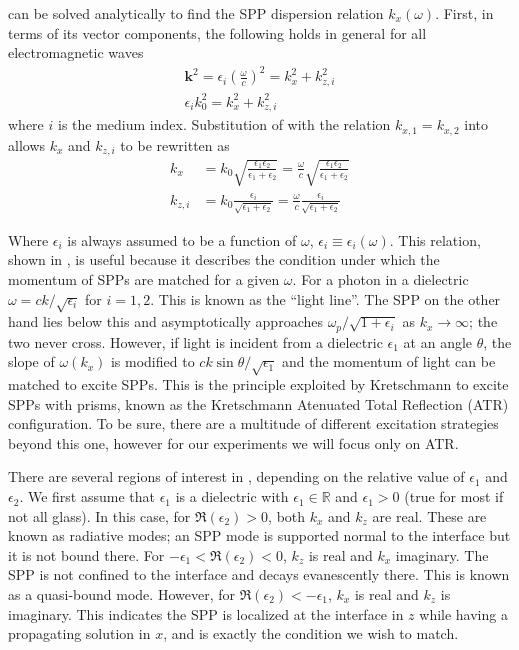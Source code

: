  can be solved analytically to find the SPP
dispersion relation $k_x(\omega)$.
First, in terms of its vector components, the following holds in general
for all electromagnetic waves
\begin{align}
\mathbf{k}^2=\epsilon_i \left(\frac{\omega}{c}\right)^2=k_x^2 + k_{z,i}^2\\
\epsilon_i k_0^2=k_x^2 + k_{z,i}^2
\label{eqn:dispersion1}
\end{align}
where $i$ is the medium index.
Substitution of  with the relation 
$k_{x,1}=k_{x,2}$ into  allows 
$k_x$ and $k_{z,i}$ to be rewritten as
\begin{align}
k_x &= k_0\sqrt{\frac{\epsilon_1 \epsilon_2}{\epsilon_1+\epsilon_2}} 
= \frac{\omega}{c}\sqrt{\frac{\epsilon_1 \epsilon_2}{\epsilon_1+\epsilon_2}}\\
k_{z,i} &= k_0\frac{\epsilon_i}{\sqrt{\epsilon_1+\epsilon_2}}
= \frac{\omega}{c}\frac{\epsilon_i}{\sqrt{\epsilon_1+\epsilon_2}}
\end{align}

Where $\epsilon_i$ is always assumed to be a function of $\omega$, 
$\epsilon_i\equiv\epsilon_i(\omega)$.  This relation, shown in
, is useful because it describes the
condition under which the momentum of SPPs are matched for a given
$\omega$.  For a photon in a dielectric $\omega = c k /\sqrt{\epsilon_i}$
for $i=1,2$.  This is known as the ``light line''.  The SPP on the other
hand lies below this and asymptotically approaches
$\omega_p/\sqrt{1+\epsilon_i}$ as $k_x\to\infty$; the two never cross.
However, if light is incident from a dielectric $\epsilon_1$ at an angle
$\theta$, the slope of $\omega(k_x)$ is modified to $c k \sin
\theta/\sqrt{\epsilon_1}$ and the momentum of light can be matched to
excite SPPs.  This is the principle exploited by Kretschmann
\cite{kretschmann1968} to excite SPPs with prisms, known as the
Kretschmann Atenuated Total Reflection (ATR) configuration.  To be sure,
there are a multitude of different excitation strategies beyond this one,
however for our experiments we will focus only on ATR.

There are several regions of interest in ,
depending on the relative value of $\epsilon_1$ and $\epsilon_2$.  We first
assume that $\epsilon_1$ is a dielectric with $\epsilon_1\in\mathbb{R}$ and
$\epsilon_1 > 0$ (true for most if not all glass).  In this case, for
$\Re(\epsilon_2)>0$, both $k_x$ and $k_z$ are real.  These are known as
radiative modes; an SPP mode is supported normal to the interface but
it is not bound there.  For $-\epsilon_1<\Re(\epsilon_2)<0$, $k_z$ is real
and $k_x$ imaginary.  The SPP is not confined to the interface and decays
evanescently there. This is known as a quasi-bound mode.  However, for
$\Re(\epsilon_2)<-\epsilon_1$, $k_x$ is real and $k_z$ is imaginary.  This
indicates the SPP is localized at the interface in $z$ while having a
propagating solution in $x$, and is exactly the condition we wish to match.

